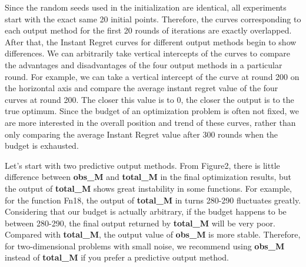 \documentclass{article}
\begin{document}
\hspace{2em}Since the random seeds used in the initialization are identical, all experiments start with the exact same 20 initial points. Therefore, the curves corresponding to each output method for the first 20 rounds of iterations are exactly overlapped. After that, the Instant Regret curves for different output methods begin to show differences. We can arbitrarily take vertical intercepts of the curves to compare the advantages and disadvantages of the four output methods in a particular round. For example, we can take a vertical intercept of the curve at round 200 on the horizontal axis and compare the average instant regret value of the four curves at round 200. The closer this value is to 0, the closer the output is to the true optimum. Since the budget of an optimization problem is often not fixed, we are more interested in the overall position and trend of these curves, rather than only comparing the average Instant Regret value after 300 rounds when the budget is exhausted.

\hspace{2em}Let's start with two predictive output methods. From Figure2, there is little difference between \textbf{obs\_M} and \textbf{total\_M} in the final optimization results, but the output of \textbf{total\_M} shows great instability in some functions. For example, for the function Fn18, the output of \textbf{total\_M} in turns 280-290 fluctuates greatly. Considering that our budget is actually arbitrary, if the budget happens to be between 280-290, the final output returned by \textbf{total\_M} will be very poor. Compared with \textbf{total\_M}, the output value of \textbf{obs\_M} is more stable. Therefore, for two-dimensional problems with small noise, we recommend using \textbf{obs\_M} instead of \textbf{total\_M} if you prefer a predictive output method.
\end{document}

